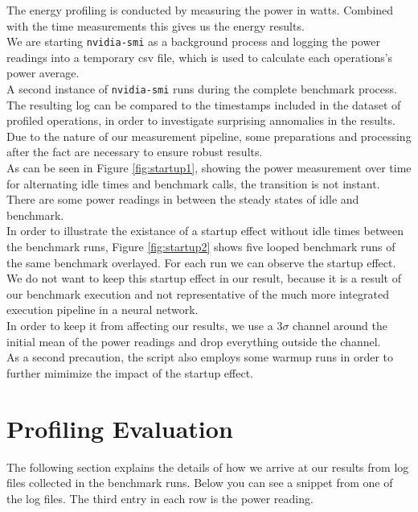 The energy profiling is conducted by measuring the power in watts. Combined with the time measurements this gives us the energy results. \\
We are starting \texttt{nvidia-smi} as a background process and logging the power readings into a temporary csv file, which is used to calculate each operations's power average. \\
A second instance of \texttt{nvidia-smi} runs during the complete benchmark process. The resulting log can be compared to the timestamps included in the dataset of profiled operations, in order to investigate surprising annomalies in the results. \\
Due to the nature of our measurement pipeline, some preparations and processing after the fact are necessary to ensure robust results. \\
As can be seen in Figure \ref{fig:startup1}, showing the power measurement over time for alternating idle times and benchmark calls, the transition is not instant. There are some power readings in between the steady states of idle and benchmark. \\
In order to illustrate the existance of a startup effect without idle times between the benchmark runs, Figure \ref{fig:startup2} shows five looped benchmark runs of the same benchmark overlayed. For each run we can observe the startup effect. \\
We do not want to keep this startup effect in our result, because it is a result of our benchmark execution and not representative of the much more integrated execution pipeline in a neural network.\\
In order to keep it from affecting our results, we use a $3\sigma$ channel around the initial mean of the power readings and drop everything outside the channel. \\
As a second precaution, the script also employs some warmup runs in order to further mimimize the impact of the startup effect.\\



\section{Profiling Evaluation}


The following section explains the details of how we arrive at our results from log files collected in the benchmark runs. Below you can see a snippet from one of the log files. The third entry in each row is the power reading.

